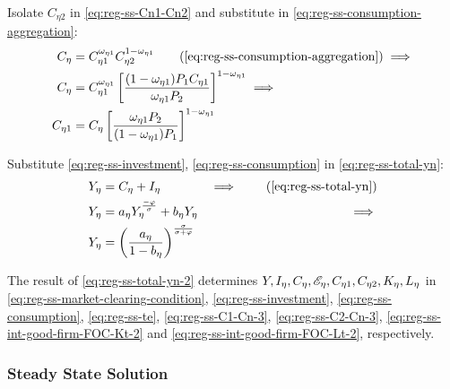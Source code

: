 \documentclass[../thesis.tex]{subfiles}
\begin{document}
Isolate $C_{\eta 2}$ in \ref{eq:reg-ss-Cn1-Cn2} and substitute in \ref{eq:reg-ss-consumption-aggregation}:
\begin{align}
	C_{\eta} &= C_{\eta 1}^{\omega_{\eta 1}} C_{\eta 2}^{1-\omega_{\eta 1}} \tag{\ref{eq:reg-ss-consumption-aggregation}} \implies \\
	C_{\eta} &= C_{\eta 1}^{\omega_{\eta 1}} \left[ \frac{(1 -\omega_{\eta 1}) P_{1} C_{\eta 1}}{\omega_{\eta 1} P_{2}} \right]^{1-\omega_{\eta 1}} \implies \nonumber \\
	C_{\eta 1} &= C_{\eta} \left[ \frac{\omega_{\eta 1} P_{2}}{(1 - \omega_{\eta 1}) P_{1}} \right]^{1-\omega_{\eta 1}} \label{eq:reg-ss-C1-Cn-3}
\end{align}


Substitute \ref{eq:reg-ss-investment}, \ref{eq:reg-ss-consumption} in \ref{eq:reg-ss-total-yn}:
	\begin{alignat}{2}
		Y_{\eta} &= C_{\eta} + I_{\eta} &\implies \tag{\ref{eq:reg-ss-total-yn}} \\
		Y_{\eta} &= a_{\eta} Y_{\eta}^{\frac{-\varphi}{\sigma}} + b_{\eta} Y_{\eta} &\implies \nonumber \\
		Y_{\eta} &= \left( \frac{a_{\eta}}{1 - b_{\eta}} \right)^{\frac{\sigma}{\sigma + \varphi}} \label{eq:reg-ss-total-yn-2}
	\end{alignat}


	The result of \ref{eq:reg-ss-total-yn-2} determines $Y, I_{\eta}, C_{\eta}, \te[],  C_{\eta 1}, C_{\eta 2}, K_{\eta}, L_{\eta}$ in \ref{eq:reg-ss-market-clearing-condition}, \ref{eq:reg-ss-investment}, \ref{eq:reg-ss-consumption}, \ref{eq:reg-ss-te},  \ref{eq:reg-ss-C1-Cn-3}, \ref{eq:reg-ss-C2-Cn-3}, \ref{eq:reg-ss-int-good-firm-FOC-Kt-2} and \ref{eq:reg-ss-int-good-firm-FOC-Lt-2}, respectively.


	
	
	\subsubsection{Steady State Solution}
	
\end{document}
